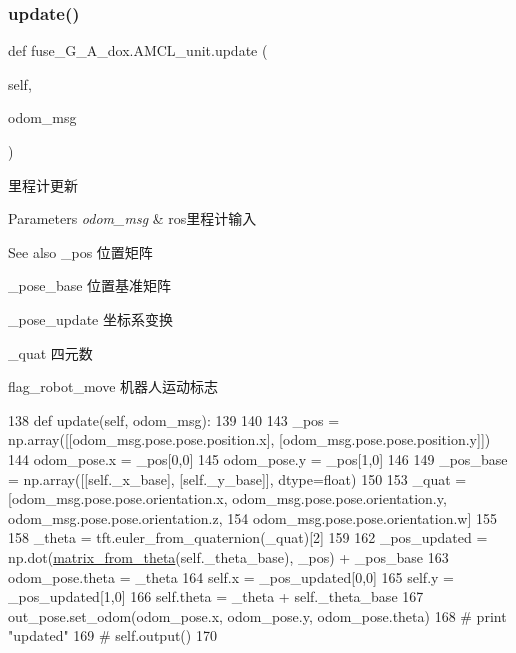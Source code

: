 \subsubsection{\texorpdfstring{update()}{update()}}
{\footnotesize\ttfamily def fuse\+\_\+\+G\+\_\+\+A\+\_\+dox.\+A\+M\+C\+L\+\_\+unit.\+update (\begin{DoxyParamCaption}\item[{}]{self,  }\item[{}]{odom\+\_\+msg }\end{DoxyParamCaption})}



里程计更新 


\begin{DoxyParams}{Parameters}
{\em odom\+\_\+msg} & ros里程计输入\\
\hline
\end{DoxyParams}
\begin{DoxySeeAlso}{See also}
\+\_\+pos 位置矩阵 

\+\_\+pose\+\_\+base 位置基准矩阵 

\+\_\+pose\+\_\+update 坐标系变换 

\+\_\+quat 四元数 

flag\+\_\+robot\+\_\+move 机器人运动标志 
\end{DoxySeeAlso}

\begin{DoxyCode}
138     \textcolor{keyword}{def }update(self, odom\_msg):
139 
140         
143         \_pos = np.array([[odom\_msg.pose.pose.position.x], [odom\_msg.pose.pose.position.y]])
144         odom\_pose.x = \_pos[0,0]
145         odom\_pose.y = \_pos[1,0]
146         
149         \_pos\_base = np.array([[self.\_x\_base], [self.\_y\_base]], dtype=float)
150         
153         \_quat = [odom\_msg.pose.pose.orientation.x, odom\_msg.pose.pose.orientation.y, 
      odom\_msg.pose.pose.orientation.z,
154                  odom\_msg.pose.pose.orientation.w]
155         
158         \_theta = tft.euler\_from\_quaternion(\_quat)[2]
159         
162         \_pos\_updated = np.dot(\hyperlink{namespacefuse___g___a__dox_a74ca52501813c654c46db737d87fd009}{matrix\_from\_theta}(self.\_theta\_base), \_pos) + \_pos\_base
163         odom\_pose.theta = \_theta
164         self.x = \_pos\_updated[0,0]
165         self.y = \_pos\_updated[1,0]
166         self.theta = \_theta + self.\_theta\_base
167         out\_pose.set\_odom(odom\_pose.x, odom\_pose.y, odom\_pose.theta)
168         \textcolor{comment}{# print "updated"}
169         \textcolor{comment}{# self.output()}
170 
\end{DoxyCode}


